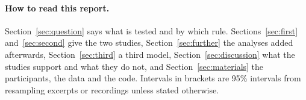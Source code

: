 \paragraph{How to read this report.}
Section~\ref{sec:question} says what is tested and by which rule. Sections~\ref{sec:first} and~\ref{sec:second}
give the two studies, Section~\ref{sec:further} the analyses added afterwards, Section~\ref{sec:third} a third
model, Section~\ref{sec:discussion} what
the studies support and what they do not, and Section~\ref{sec:materials} the participants, the data and the
code. Intervals in brackets are 95\% intervals from resampling excerpts or recordings unless stated otherwise.
